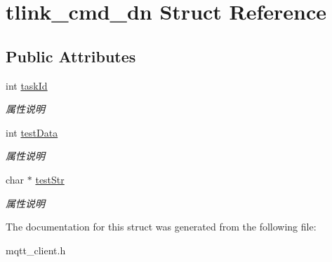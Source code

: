 \hypertarget{structtlink__cmd__dn}{}\section{tlink\+\_\+cmd\+\_\+dn Struct Reference}
\label{structtlink__cmd__dn}
\subsection*{Public Attributes}
\begin{DoxyCompactItemize}
\item 
\mbox{\label{structtlink__cmd__dn_a245cd0e1835ab776060c4fbcfe9498cf}} 
int \mbox{\hyperlink{structtlink__cmd__dn_a245cd0e1835ab776060c4fbcfe9498cf}{task\+Id}}
\begin{DoxyCompactList}\small\item\em 属性说明 \end{DoxyCompactList}\item 
\mbox{\label{structtlink__cmd__dn_af0f90bec703cc22ee01e611a28ed886f}} 
int \mbox{\hyperlink{structtlink__cmd__dn_af0f90bec703cc22ee01e611a28ed886f}{test\+Data}}
\begin{DoxyCompactList}\small\item\em 属性说明 \end{DoxyCompactList}\item 
\mbox{\label{structtlink__cmd__dn_aedf154722c9835c244b82793c4c74ada}} 
char $\ast$ \mbox{\hyperlink{structtlink__cmd__dn_aedf154722c9835c244b82793c4c74ada}{test\+Str}}
\begin{DoxyCompactList}\small\item\em 属性说明 \end{DoxyCompactList}\end{DoxyCompactItemize}


The documentation for this struct was generated from the following file\+:\begin{DoxyCompactItemize}
\item 
mqtt\+\_\+client.\+h\end{DoxyCompactItemize}
